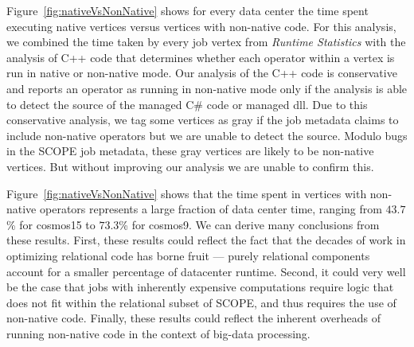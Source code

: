 
Figure~\ref{fig:nativeVsNonNative} shows for every data center the time spent executing native vertices versus vertices with non-native code. 
For this analysis, we combined the time taken by every job vertex from \emph{Runtime Statistics} with the analysis of C++ code that determines whether each operator within a vertex is run in native or non-native mode. 
Our analysis of the C++ code is conservative and reports an operator as running in non-native mode only if the analysis is able to detect the source of the managed C\# code or managed dll. 
Due to this conservative analysis, we tag some vertices as gray if the job metadata claims to include non-native operators but we are unable to detect the source. 
Modulo bugs in the SCOPE job metadata, these gray vertices are likely to be non-native vertices. But without improving our analysis we are unable to confirm this. 


Figure~\ref{fig:nativeVsNonNative} shows that the time spent in vertices with non-native operators represents a large fraction of data center time, ranging from $43.7$\% for cosmos15 to $73.3$\% for cosmos9. 
We can derive many conclusions from these results. First, these results could reflect the fact that the decades of work in optimizing relational code has borne fruit --- purely relational components account for a smaller percentage of datacenter runtime. Second, it could very well be the case that jobs with inherently expensive computations require logic that does not fit within the relational subset of SCOPE, and thus requires the use of non-native code. Finally,
these results could reflect the inherent overheads of running non-native code in the context of big-data processing. 

